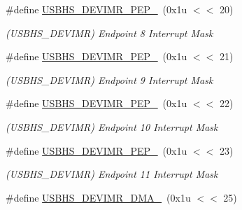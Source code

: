 \begin{DoxyCompactItemize}
\mbox{\label{group__SAME70__USBHS_ga7c8704094858d52eea2afa2793403877}} 
\#define \mbox{\hyperlink{group__SAME70__USBHS_ga7c8704094858d52eea2afa2793403877}{U\+S\+B\+H\+S\+\_\+\+D\+E\+V\+I\+M\+R\+\_\+\+P\+E\+P\+\_}}~(0x1u $<$$<$ 20)
\begin{DoxyCompactList}\small\item\em (U\+S\+B\+H\+S\+\_\+\+D\+E\+V\+I\+MR) Endpoint 8 Interrupt Mask \end{DoxyCompactList}\item 
\mbox{\label{group__SAME70__USBHS_ga870c505db29e638559d066668532a7a5}} 
\#define \mbox{\hyperlink{group__SAME70__USBHS_ga870c505db29e638559d066668532a7a5}{U\+S\+B\+H\+S\+\_\+\+D\+E\+V\+I\+M\+R\+\_\+\+P\+E\+P\+\_}}~(0x1u $<$$<$ 21)
\begin{DoxyCompactList}\small\item\em (U\+S\+B\+H\+S\+\_\+\+D\+E\+V\+I\+MR) Endpoint 9 Interrupt Mask \end{DoxyCompactList}\item 
\mbox{\label{group__SAME70__USBHS_gacf5dcbb079ec3e4ec394ab4d1ec2e3f5}} 
\#define \mbox{\hyperlink{group__SAME70__USBHS_gacf5dcbb079ec3e4ec394ab4d1ec2e3f5}{U\+S\+B\+H\+S\+\_\+\+D\+E\+V\+I\+M\+R\+\_\+\+P\+E\+P\+\_}}~(0x1u $<$$<$ 22)
\begin{DoxyCompactList}\small\item\em (U\+S\+B\+H\+S\+\_\+\+D\+E\+V\+I\+MR) Endpoint 10 Interrupt Mask \end{DoxyCompactList}\item 
\mbox{\label{group__SAME70__USBHS_ga555e0be777ded08b48792e9b30baebd8}} 
\#define \mbox{\hyperlink{group__SAME70__USBHS_ga555e0be777ded08b48792e9b30baebd8}{U\+S\+B\+H\+S\+\_\+\+D\+E\+V\+I\+M\+R\+\_\+\+P\+E\+P\+\_}}~(0x1u $<$$<$ 23)
\begin{DoxyCompactList}\small\item\em (U\+S\+B\+H\+S\+\_\+\+D\+E\+V\+I\+MR) Endpoint 11 Interrupt Mask \end{DoxyCompactList}\item 
\mbox{\label{group__SAME70__USBHS_gaec1f297e81c46ad2484071b0bf34e859}} 
\#define \mbox{\hyperlink{group__SAME70__USBHS_gaec1f297e81c46ad2484071b0bf34e859}{U\+S\+B\+H\+S\+\_\+\+D\+E\+V\+I\+M\+R\+\_\+\+D\+M\+A\+\_}}~(0x1u $<$$<$ 25)
$$
\end{DoxyCompactItemize}
